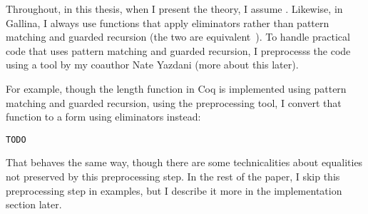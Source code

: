 Throughout, in this thesis, when I present the theory, I assume .
Likewise, in Gallina, I always use functions that apply eliminators rather than pattern matching
and guarded recursion (the two are equivalent~\cite{TODO}).
To handle practical code that uses pattern matching and guarded recursion,
I preprocesss the code using a tool by my coauthor Nate Yazdani (more about this later).

For example, though the length function in Coq is implemented using pattern matching and guarded recursion,
using the preprocessing tool, I convert that function to a form using eliminators instead:

\begin{lstlisting}
TODO
\end{lstlisting}
That behaves the same way, though there are some technicalities about equalities not preserved by this preprocessing step.
In the rest of the paper, I skip this preprocessing step in examples, but I describe it more in the implementation section later.

